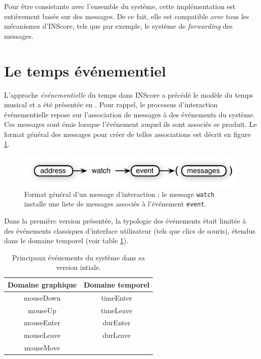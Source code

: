 \documentclass{article}
\newcommand{\OSC}[1]	{{\fontsize{9pt}{9pt} \selectfont\texttt{#1}}}
\begin{document}
Pour être consistante avec l'ensemble du système, cette implémentation est entièrement basée sur des messages. De ce fait, elle est compatible avec tous les mécanismes d'INScore, tels que par exemple, le système de \emph{forwarding} des messages. 


\section{Le temps événementiel}\label{evtime}

L'approche \emph{événementielle} du temps dans INScore a précédé le modèle du temps musical et a été présentée en \cite{fober13a}. Pour rappel, le processus d'interaction événementielle repose sur l'association de messages à des événements du système. Ces messages sont émis lorsque l'événement auquel ils sont associés se produit. Le format général des messages pour créer de telles associations est décrit en figure \ref{fig:watch}.

\begin{figure}[htbp]
\centerline{
	\includegraphics[width=0.95\columnwidth]{imgs/watch}}
\caption{Format général d'un message d'interaction : le message \OSC{watch} installe une liste de messages associés à l'événement \OSC{event}.}
\label{fig:watch}
\end{figure}


Dans la première version présentée, la typologie des événements était limitée à des événements classiques d'interface utilisateur (tels que clics de souris), étendus dans le domaine temporel (voir table \ref{tbl:evts}). 

\begin{table}[htp]
\begin{center}
\begin{tabular}{c|c}
Domaine graphique & Domaine temporel \\
\hline
mouseDown 		& timeEnter	\\
mouseUp			& timeLeave	\\
mouseEnter		& durEnter		\\
mouseLeave		& durLeave		\\
mouseMove		&				\\
\end{tabular}
\end{center}
\caption{Principaux événements du système dans sa version intiale.}
\label{tbl:evts}
\end{table}%
\end{document}
